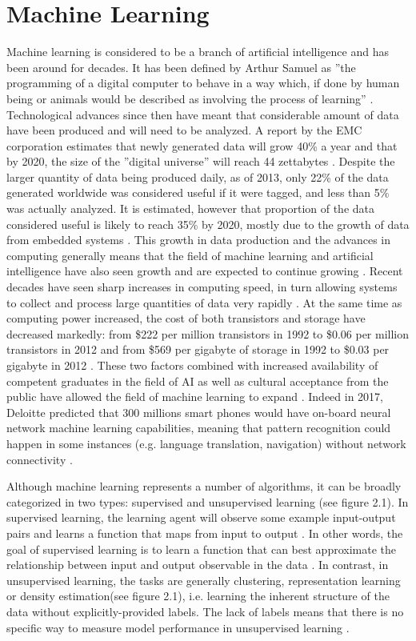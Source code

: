 \section{Machine Learning}
Machine learning is considered to be a branch of artificial intelligence and has been around for decades. It has been defined by Arthur Samuel as ''the programming of a digital computer to behave in a way which, if done by human being or animals would be described as involving the process of learning'' \citep{Samuel:1959vp}.  Technological advances since then have meant that considerable amount of data have been produced and will need to be analyzed. A report by the EMC corporation estimates that newly generated data will grow 40\% a year and that by 2020, the size of the ''digital universe'' will reach 44 zettabytes \citep{EMC:ylTs53OV}. Despite the larger quantity of data being produced daily, as of 2013, only 22\% of the data generated worldwide was considered useful if it were tagged, and less than 5\% was actually analyzed. It is estimated, however that proportion of the data considered useful is likely to reach 35\% by 2020, mostly due to the growth of data from embedded systems \citep{EMC:ylTs53OV}. 
This growth in data production and the advances in computing generally means that the field of machine learning and artificial intelligence have also seen growth and are expected to continue growing \citep{Colombus:wm}. Recent decades have seen sharp increases in computing speed, in turn allowing systems to collect and process large quantities of data very rapidly \citep{Denning:2016fz} . At the same time as computing power increased, the cost of both transistors and storage have decreased markedly: from \$222 per million transistors in 1992 to \$0.06 per million transistors in 2012 and from \$569 per gigabyte of storage in 1992 to \$0.03 per gigabyte in 2012 \citep{Hagel:2013ur}. These two factors combined with increased availability of competent graduates in the field of AI as well as cultural acceptance from the public have allowed the field of machine learning to expand \citep{Evans:sHGdqFvY}. Indeed in 2017, Deloitte predicted that 300 millions smart phones would have on-board neural network machine learning capabilities, meaning that pattern recognition could happen in some instances (e.g. language translation, navigation) without network connectivity \citep{Deloitte:2017wo}.

Although machine learning represents a number of algorithms, it can be broadly categorized in two types: supervised and unsupervised learning (see figure 2.1). In supervised learning, the learning agent will observe some example input-output pairs and learns a function that maps from input to output \citep{Russell:2016tz}. In other words, the goal of supervised learning is to learn a function that can best approximate the relationship between input and output observable in the data \citep{Mullainathan:uy}. 
In contrast, in unsupervised learning, the tasks are generally clustering, representation learning or density estimation(see figure 2.1), i.e. learning the inherent structure of the data without explicitly-provided labels. The lack of labels means that there is no specific way to measure model performance in unsupervised learning \citep{Soni:tr}.

